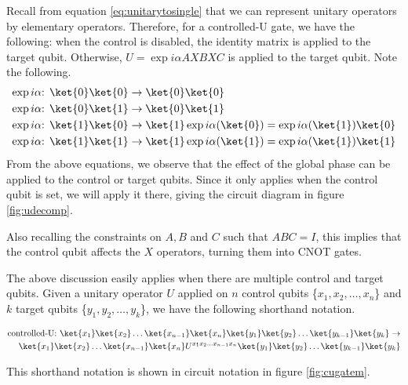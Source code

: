 Recall from equation \ref{eq:unitarytosingle} that we can represent unitary operators by elementary operators. Therefore, for a controlled-U gate, we have the following: when the control is disabled, the identity matrix is applied to the target qubit. Otherwise, $U = \exp{i\alpha}AXBXC$ is applied to the target qubit. Note the following. 
\begin{align}
\exp{i\alpha}\text{: } \ket{0}\ket{0} &\rightarrow \ket{0}\ket{0}\\
\exp{i\alpha}\text{: } \ket{0}\ket{1} &\rightarrow \ket{0}\ket{1}\\
\exp{i\alpha}\text{: } \ket{1}\ket{0} &\rightarrow \ket{1}\exp{i\alpha}(\ket{0}) = \exp{i\alpha}(\ket{1})\ket{0}\\
\exp{i\alpha}\text{: } \ket{1}\ket{1} &\rightarrow \ket{1}\exp{i\alpha}(\ket{1}) = \exp{i\alpha}(\ket{1})\ket{1}
\end{align}
From the above equations, we observe that the effect of the global phase can be applied to the control or target qubits. Since it only applies when the control qubit is set, we will apply it there, giving the circuit diagram in figure \ref{fig:udecomp}.


Also recalling the constraints on $A, B$ and $C$ such that $ABC = I$, this implies that the control qubit affects the $X$ operators, turning them into \textsc{CNOT} gates. 

The above discussion easily applies when there are multiple control and target qubits. Given a unitary operator $U$ applied on $n$ control qubits \{$x_1,x_2,\ldots,x_n$\} and $k$ target qubits \{$y_1,y_2,\dots,y_k$\}, we have the following shorthand notation.

\begin{align}
\text{controlled-U: } \ket{x_1}\ket{x_2}\ldots\ket{x_{n-1}}\ket{x_n}\ket{y_1}\ket{y_2}\ldots\ket{y_{k-1}}\ket{y_k} \rightarrow\\ \ket{x_1}\ket{x_2}\ldots\ket{x_{n-1}}\ket{x_n}U^{x_1x_2\ldots x_{n-1}x_n}\ket{y_1}\ket{y_2}\ldots\ket{y_{k-1}}\ket{y_k}
\end{align}

This shorthand notation is shown in circuit notation in figure \ref{fig:cugatem}.


